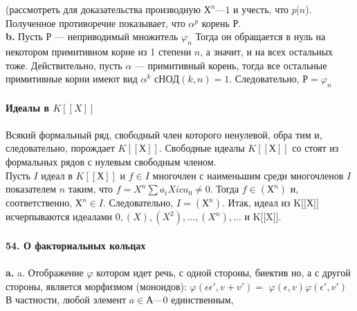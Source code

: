 \noindent (рассмотреть для доказательства производную $Х^{n} — 1$ и учесть, \linebreak
что $p|n$). Полученное противоречие показывает, что $\alpha^{p}$ корень $Р$.\\
\hspace*{15pt}\textbf{b.} Пусть $Р$ — неприводимый множитель $\varphi_n$ Тогда он обращается\linebreak
в нуль на некотором примитивном корне из 1 степени $n$, а значит, и на\linebreak
всех остальных тоже. Действительно, пусть $\alpha$ — примитивный корень,\linebreak
тогда все остальные примитивные корни имеют вид $\alpha^{k}$ $с НОД(k, n) = 1$.\linebreak
Следовательно, $Р = \varphi_n$\\
\\
\noindent\textbf{Идеалы в $K[[X]]$}\\
\\
\hspace*{15pt} Всякий формальный ряд, свободный член которого ненулевой, обра­\linebreak
тим и, следовательно, порождает $K[[Х]]$. Свободные идеалы $K[[Х]]$ со­\linebreak
стоят из формальных рядов с нулевым свободным членом.\\
\hspace*{0pt} Пусть $I$ идеал в $K[[Х]]$ и $f \in I$ многочлен с наименьшим среди\linebreak
многочленов $I$ показателем $n$ таким, что $f = X^{n}\sum a_{i}X{i} c a_0 \neq 0$. Тогда\linebreak
$f \in (Х^{n})$ и, соответственно, $Х^{n} \in I$. Следовательно, $I = (Х^{n}).$ Итак,\linebreak
идеал из K[[Х]] исчерпываются идеалами ${0}, (X), (X^{2}),\ldots, (X^{n} ), \ldots$ и\linebreak
K[[X]].\\
\\
\noindent\textbf{54. О факториальных кольцах}\\
\\
\hspace*{15pt}\textbf{a.} a. Отображение $\varphi$ котором идет речь, с одной стороны, биектив­\linebreak
но, а с другой стороны, является морфизмом (моноидов): $\varphi(\epsilon\epsilon',v + v') =$\linebreak
$\varphi(\epsilon,v)\varphi(\epsilon', v')$ В частности, любой элемент $a \in А — {0}$ единственным,\linebreak
